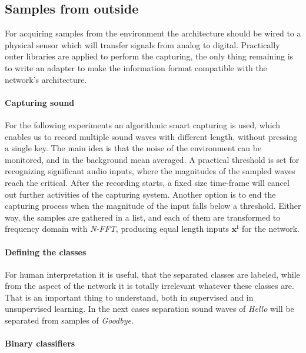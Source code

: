 \subsection{Samples from outside}
For acquiring samples from the environment the architecture should be wired to a physical sensor which will transfer signals from analog to digital. 
Practically outer libraries are applied to perform the capturing, the only thing remaining is to write an adapter to make the information format compatible with the network's architecture.

\paragraph{Capturing sound}
For the following experiments an algorithmic smart capturing is used, which enables us to record multiple sound waves with different length, without pressing a single key. The main idea is that the noise of the environment can be monitored, and in the background mean averaged. A practical threshold is set for recognizing significant audio inputs, where the magnitudes of the sampled waves reach the critical. After the recording starts, a fixed size time-frame will cancel out further activities of the capturing system. Another option is to end the capturing process when the magnitude of the input falls below a threshold. Either way, the samples are gathered in a list, and each of them are transformed to frequency domain with \emph{N-FFT}, producing equal length inputs  $\mathbf{x^i}$ for the network.

\paragraph{Defining the classes}
For human interpretation it is useful, that the separated classes are labeled, while from the aspect of the network it is totally irrelevant whatever these classes are. That is an important thing to understand, both in supervised and in unsupervised learning. In the next cases separation sound waves of \emph{Hello} will be separated from samples of \emph{Goodbye}.

\paragraph{Binary classifiers}
